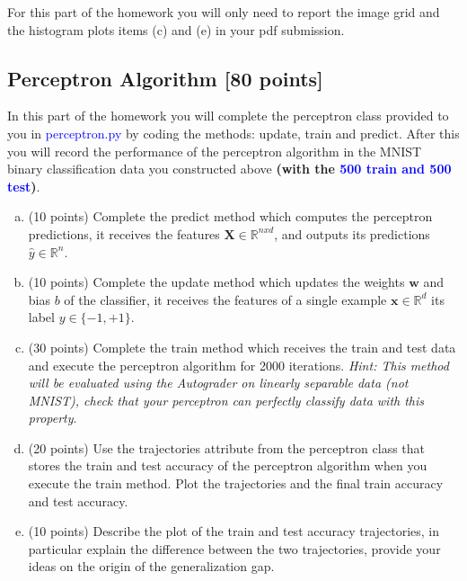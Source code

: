 For this part of the homework you will only need to report the image grid and the histogram plots items (c) and (e) in your pdf submission.

\newpage
\subsection{Perceptron Algorithm [80 points]}

In this part of the homework you will complete the perceptron class provided to you in \textcolor{blue}{perceptron.py} by coding the methods: update, train and predict. After this you will record the performance of the perceptron algorithm in the MNIST binary classification data you constructed above \textbf{(with the \textcolor{blue}{500 train and 500 test})}.

\begin{enumerate}[(a)]
    \item (10 points) Complete the predict method which computes the perceptron predictions, it receives the features $\mathbf{X} \in \mathbb{R}^{nxd}$, and outputs its predictions $\hat{y}\in\mathbb{R}^{n}$.
    
    \item (10 points) Complete the update method which updates the weights $\mathbf{w}$ and bias $b$ of the classifier, it receives the features of a single example $\mathbf{x} \in \mathbb{R}^{d}$ its label $y\in\{-1,+1\}$.

    \item (30 points) Complete the train method which receives the train and test data and execute the perceptron algorithm for 2000 iterations. \textit{Hint: This method will be evaluated using the Autograder on linearly separable data (not MNIST), check that your perceptron can perfectly classify data with this property}.
    
    \item (20 points) Use the trajectories attribute from the perceptron class that stores the train and test accuracy of the perceptron algorithm when you execute the train method. Plot the trajectories and the final train accuracy and test accuracy.
    
    \item (10 points) Describe the plot of the train and test accuracy trajectories, in particular explain the difference between the two trajectories, provide your ideas on the origin of the generalization gap.
\end{enumerate}

